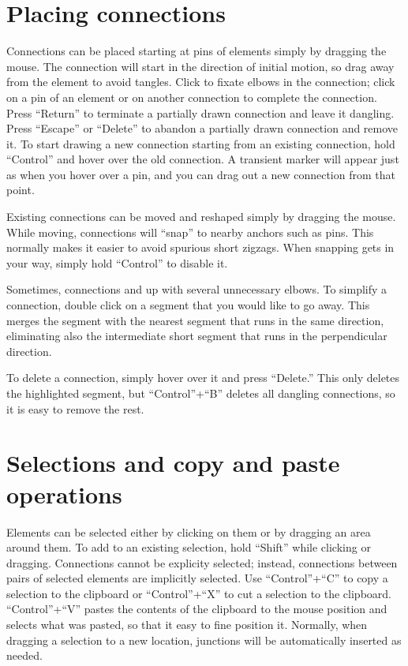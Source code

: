 \documentclass[11pt]{report}
\begin{document}
\section{Placing connections}

Connections can be placed starting at pins of elements simply by
dragging the mouse. The connection will start in the direction of
initial motion, so drag away from the element to avoid tangles. Click
to fixate elbows in the connection; click on a pin of an element or on
another connection to complete the connection. Press ``Return'' to
terminate a partially drawn connection and leave it dangling. Press
``Escape'' or ``Delete'' to abandon a partially drawn connection and
remove it. To start drawing a new connection starting from an existing
connection, hold ``Control'' and hover over the old connection. A
transient marker will appear just as when you hover over a pin, and
you can drag out a new connection from that point.

Existing connections can be
moved and reshaped simply by dragging the mouse. While moving,
connections will ``snap'' to nearby anchors such as pins. This
normally makes it easier to avoid spurious short zigzags. When
snapping gets in your way, simply hold ``Control'' to disable it.

Sometimes, connections and up with several unnecessary elbows. To
simplify a connection, double click on a segment that you would like
to go away. This merges the segment with the nearest segment that runs
in the same direction, eliminating also the intermediate short segment
that runs in the perpendicular direction.

To delete a connection, simply hover over it and press ``Delete.''
This only deletes the highlighted segment, but ``Control''+``B''
deletes all dangling connections, so it is easy to remove the rest.

\section{Selections and copy and paste operations}

Elements can be selected either by clicking on them or by dragging an
area around them. To add to an existing selection, hold ``Shift''
while clicking or dragging. Connections cannot be explicity selected;
instead, connections between pairs of selected elements are implicitly
selected. Use ``Control''+``C'' to copy a selection to the clipboard
or ``Control''+``X'' to cut a selection to the
clipboard. ``Control''+``V'' pastes the contents of the clipboard to
the mouse position and selects what was pasted, so that it easy to
fine position it. Normally, when dragging a selection to a new
location, junctions will be automatically inserted as needed.
\end{document}
